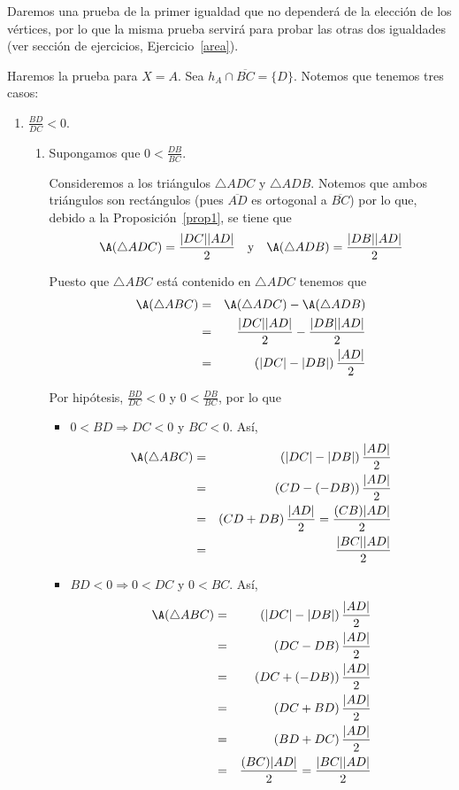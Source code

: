 \begin{pba}
Daremos una prueba de la primer igualdad que no dependerá de la elección de los vértices, por lo que la misma prueba servirá para probar las otras dos igualdades (ver sección de ejercicios, Ejercicio~\ref{area}).

Haremos la prueba para $X=A$. Sea $h_A \cap \overline{BC} =\{D\}$. Notemos que tenemos tres casos:
\begin{enumerate}
\item $\frac{BD}{DC} < 0$. 
\begin{enumerate}
\item Supongamos que $0 < \frac{DB}{BC}$.

Consideremos a los triángulos $\triangle ADC$ y $\triangle ADB$. Notemos que ambos triángulos son rectángulos (pues $\overline{AD}$ es ortogonal a $\overline{BC}$) por lo que, debido a la Proposición~\ref{prop1}, se tiene que
$$\A(\triangle ADC)= \frac{|DC||AD|}{2} \quad \text{y} \quad \A(\triangle ADB) = \frac{|DB||AD|}{2}$$

Puesto que $\triangle ABC$ está contenido en $\triangle ADC$ tenemos que
\begin{eqnarray*}
\A(\triangle ABC) &=& \A(\triangle ADC)-\A(\triangle ADB)\\
&=& \frac{|DC||AD|}{2} -  \frac{|DB||AD|}{2}\\
&=& \left(|DC|-|DB|\right)\frac{|AD|}{2} 
\end{eqnarray*}

Por hipótesis, $\frac{BD}{DC}<0$ y $0< \frac{DB}{BC}$, por lo que
\begin{itemize}
\item $0<BD \Rightarrow DC<0$ y $BC <0$. Así,
\begin{eqnarray*}
\A(\triangle ABC) &=& \left(|DC|-|DB|\right)\frac{|AD|}{2}\\
&=&   \left(CD-(-DB)\right)\frac{|AD|}{2}\\
&=&   \left(CD +DB\right)\frac{|AD|}{2} = \frac{(CB)|AD|}{2} \\
&=& \frac{|BC||AD|}{2}\\
\end{eqnarray*}



\item $BD<0 \Rightarrow 0<DC$ y $0<BC$. Así, 
\begin{eqnarray*}
\A(\triangle ABC) &=& \left(|DC|-|DB|\right)\frac{|AD|}{2}\\
&=&   \left(DC-DB\right)\frac{|AD|}{2}\\
&=&   \left(DC+(-DB)\right)\frac{|AD|}{2}\\
&=&   \left(DC+BD\right)\frac{|AD|}{2}\\
&=&   \left(BD+DC\right)\frac{|AD|}{2}\\
&=& \frac{(BC)|AD|}{2}=\frac{|BC||AD|}{2}\\
\end{eqnarray*}
\end{itemize}


\end{enumerate}
\end{enumerate}
\end{pba}
